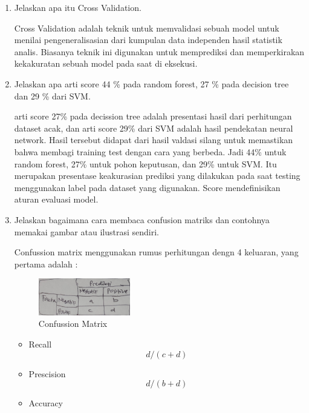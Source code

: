 \begin{enumerate}
        \item Jelaskan apa itu Cross Validation. \par
        Cross Validation adalah teknik untuk memvalidasi sebuah model untuk menilai pengeneralisasian dari kumpulan data independen hasil statistik analis. Biasanya teknik ini digunakan untuk memprediksi dan memperkirakan kekakuratan sebuah model pada saat di eksekusi.
        \item Jelaskan apa arti score 44 \% pada random forest, 27 \% pada decision tree dan 29 \% dari SVM. \par
        arti score 27\% pada decission tree adalah presentasi hasil dari perhitungan dataset acak, dan arti score 29\% dari SVM adalah hasil pendekatan neural network.  Hasil tersebut didapat dari hasil valdasi silang untuk memastikan bahwa membagi training test dengan cara yang berbeda. Jadi 44\% untuk random forest, 27\% untuk pohon keputusan, dan 29\% untuk SVM. Itu merupakan presentase keakurasian prediksi yang dilakukan pada saat testing menggunakan label pada dataset yang digunakan. Score mendefinisikan aturan evaluasi model.
        \item Jelaskan bagaimana cara membaca confusion matriks dan contohnya memakai gambar atau ilustrasi sendiri. \par
        Confussion matrix menggunakan rumus perhitungan dengn 4 keluaran, yang pertama adalah :
        \begin{figure}[H]
            \includegraphics[width=4cm]{figures/1174040/chapter3/confusion.jpeg}
            \centering
            \caption{Confussion Matrix}
        \end{figure}
            \begin{itemize}
                \item Recall
                \begin{equation}
                    d/(c+d)
                \end{equation}
                \item Prescision
                \begin{equation}
                    d/(b+d)
                \end{equation}
                \item Accuracy
                \begin{equation}

\end{equation}
\end{itemize}
\end{enumerate}
